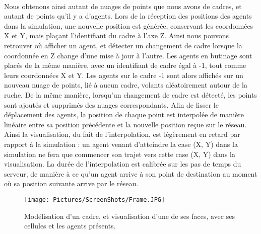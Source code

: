 		\paragraph{}
		Nous obtenons ainsi autant de nuages de points que nous avons de cadres, et autant de points qu'il y a d'agents. Lors de la réception des positions des agents dans la simulation, une nouvelle position est générée, conservant les coordonnées X et Y, mais plaçant l'identifiant du cadre à l'axe Z. Ainsi nous pouvons retrouver où afficher un agent, et détecter un changement de cadre lorsque la coordonnée en Z change d'une mise à jour à l'autre. Les agents en butinage sont placés de la même manière, avec un identifiant de cadre égal à -1, tout comme leurs coordonnées X et Y. Les agents sur le cadre -1 sont alors affichés sur un nouveau nuage de points, lié à aucun cadre, volants aléatoirement autour de la ruche. De la même manière, lorsqu'un changement de cadre est détecté, les points sont ajoutés et supprimés des nuages correspondants. Afin de lisser le déplacement des agents, la position de chaque point est interpolée de manière linéaire entre sa position précédente et la nouvelle position reçue sur le réseau. Ainsi la visualisation, du fait de l'interpolation, est légèrement en retard par rapport à la simulation : un agent venant d'atteindre la case (X, Y) dans la simulation ne fera que commencer son trajet vers cette case (X, Y) dans la visualisation. La durée de l'interpolation est calibrée sur les pas de temps du serveur, de manière à ce qu'un agent arrive à son point de destination au moment où sa position suivante arrive par le réseau.
	
	\begin{figure}
		\centering
		\texttt{[image: Pictures/ScreenShots/Frame.JPG]}
		\caption{Modélisation d'un cadre, et visualisation d'une de ses faces, avec ses cellules et les agents présents.}
		\label{PicFrame}
	\end{figure}
		
